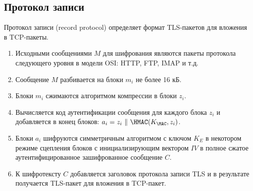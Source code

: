 \subsection{Протокол записи}

Протокол записи (record protocol) определяет формат TLS-пакетов для вложения в TCP-пакеты.

\begin{enumerate}
    \item Исходными сообщениями $M$ для шифрования являются пакеты протокола следующего уровня в модели OSI: HTTP, FTP, IMAP и т.д.
    \item Сообщение $M$ разбивается на блоки $m_i$ не более 16 кБ.
    \item Блоки $m_i$ сжимаются алгоритмом компрессии в блоки $z_i$.
    \item Вычисляется код аутентификации сообщения для каждого блока $z_i$ и добавляется в конец блоков: $a_i = z_i ~\|~ \HMAC(K_{\MAC}, z_i)$.
    \item Блоки $a_i$ шифруются симметричным алгоритмом с ключом $K_E$ в некотором режиме сцепления блоков с инициализирующим вектором $IV$ в полное сжатое аутентифицированное зашифрованное сообщение $C$.
    \item К шифротексту $C$ добавляется заголовок протокола записи TLS и в результате получается TLS-пакет для вложения в TCP-пакет.
\end{enumerate}
